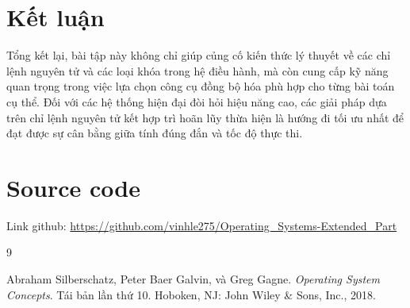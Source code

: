 \newpage

\section{Kết luận}

Tổng kết lại, bài tập này không chỉ giúp củng cố kiến thức lý thuyết về các chỉ lệnh nguyên tử và các loại khóa trong hệ điều hành, mà còn cung cấp kỹ năng quan trọng trong việc lựa chọn công cụ đồng bộ hóa phù hợp cho từng bài toán cụ thể. Đối với các hệ thống hiện đại đòi hỏi hiệu năng cao, các giải pháp dựa trên chỉ lệnh nguyên tử kết hợp trì hoãn lũy thừa hiện là hướng đi tối ưu nhất để đạt được sự cân bằng giữa tính đúng đắn và tốc độ thực thi.

\section{Source code}
Link github: \url{https://github.com/vinhle275/Operating_Systems-Extended_Part}


\begin{thebibliography}{9}

Abraham Silberschatz, Peter Baer Galvin, và Greg Gagne. 
\textit{Operating System Concepts}. 
Tái bản lần thứ 10. Hoboken, NJ: John Wiley \& Sons, Inc., 2018.

\end{thebibliography}